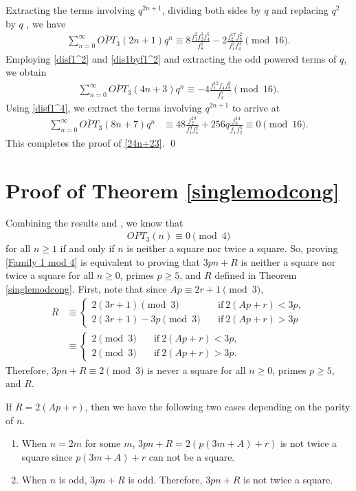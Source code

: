 \documentclass[12pt,reqno]{amsart}
\numberwithin{equation}{section}
\newcommand{\opt}{\overline{OPT}}
\begin{document}
Extracting the terms involving $q^{2n+1}$, dividing both sides by $q$ and replacing $q^2$ by $q$ , we have
\begin{align*}
     \sum_{n=0}^{\infty}\opt_3(2n+1)q^n \equiv 8\frac{ f_1^2 f_2^3 f_4^5}{f_{8}^2} - 2 \frac{ f_2^{17} f_{8}^2 }{f_1^2 f_4^9}\pmod{16}.
\end{align*}
Employing \eqref{disf1^2} and \eqref{dis1byf1^2} and extracting the odd powered terms of $q$, we obtain
\begin{align*}
     \sum_{n=0}^{\infty}\opt_3(4n+3)q^n \equiv - 4 \frac{f_{1}^{12} f_4 f_8^2}{f_2^7}\pmod{16}.
\end{align*}
Using \eqref{disf1^4}, we extract the terms involving $q^{2n+1}$ to arrive at
\begin{align*}
      \sum_{n=0}^{\infty}\opt_3(8n+7)q^n &\equiv 48 \frac{f_2^{19}}{f_1^9 f_4^2}+256 q \frac{f_4^{14}}{f_1 f_2^5} \equiv 0\pmod{16}.
\end{align*}
This completes the proof of \eqref{24n+23}. \qed

\section{Proof of Theorem \ref{singlemodcong}}\label{sec:radu1}
Combining the results \cite[Theorem 7]{SSS} and \cite[Theorem 1.1]{HSellers}, we know that \[\opt_3(n)\equiv 0 \pmod{4}\] for all $n\ge 1$ if and only if $n$ is neither a square nor twice a square. So, proving \eqref{Family 1 mod 4} is equivalent to proving that $3pn+R$ is neither a square nor twice a square for all $n\ge0$, primes $p\ge5$, and $R$ defined in Theorem \ref{singlemodcong}. First, note that since $Ap\equiv2r+1\pmod{3}$,
\begin{align*}
    R
& \equiv \begin{cases}
    2(3r+1) \pmod{3}  & \quad \text{if}\ 2(Ap+r)<3p,\\
     2(3r+1)-3p  \pmod{3} & \quad \text{if}\ 2(Ap+r)>3p
\end{cases}\\
& \equiv \begin{cases}
    2 \pmod{3}  & \quad \text{if}\ 2(Ap+r)<3p,\\
     2  \pmod{3} & \quad \text{if}\ 2(Ap+r)>3p.
\end{cases}
\end{align*}
Therefore, $3pn+R\equiv2\pmod{3}$ is never a square for all $n\ge0$, primes $p\ge5$, and $R$.

If $R=2(Ap+r)$, then we have the following two cases depending on the parity of $n$. 
\begin{enumerate}
    \item[1.] When $n=2m$ for some $m$, $3pn+R=2(p(3m+A)+r)$ is not twice a square since $p(3m+A)+r$ can not be a square.
    \item[2.] When $n$ is odd, $3pn+R$ is odd. Therefore, $3pn+R$ is not twice a square.
\end{enumerate}
\end{document}
